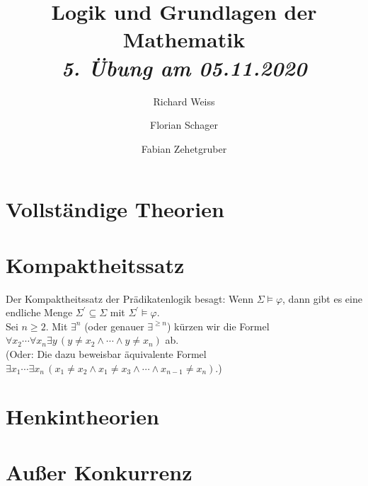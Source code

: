 \documentclass{article}
\title
{
  Logik und Grundlagen der Mathematik \\
  \vspace{4pt}
  \normalsize
  \textit{5. Übung am 05.11.2020}
}
\author
{
  Richard Weiss
  \and
  Florian Schager
  \and
  Fabian Zehetgruber
}
\date{}
\begin{document}
\maketitle
\section*{Vollständige Theorien}




\section*{Kompaktheitssatz}
Der Kompaktheitssatz der Prädikatenlogik besagt: Wenn $\Sigma \vDash \varphi$,
dann gibt es eine endliche Menge $\Sigma^{\prime} \subseteq \Sigma$ mit $\Sigma^{\prime} \vDash \varphi$. \\
Sei $n \geq 2$. Mit $\exists^n$ (oder genauer $\exists^{\geq n}$) kürzen wir die Formel
$\forall x_2\cdots\forall x_n \exists y\, (y \neq x_2 \land \cdots \land y \neq x_n)$ ab. \\
(Oder: Die dazu beweisbar äquivalente Formel $\exists x_1 \cdots \exists x_n\, (x_1 \neq x_2 \land x_1 \neq x_3
\land \cdots \land x_{n-1} \neq x_n)$.)






\section*{Henkintheorien}



\section*{Außer Konkurrenz}





\end{document}

